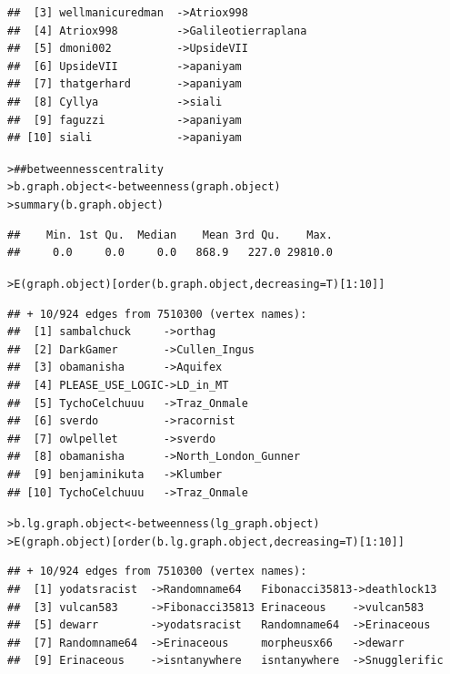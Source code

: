 \documentclass[12pt]{article}\usepackage[]{graphicx}\usepackage[]{color}
\makeatletter
\newcommand{\hlnum}[1]{\textcolor[rgb]{0.82,0.78,0.62}{#1}}%
\newcommand{\hlcom}[1]{\textcolor[rgb]{0.404,0.408,0.42}{#1}}%
\newcommand{\hlopt}[1]{\textcolor[rgb]{0.882,0.878,0.898}{#1}}%
\newcommand{\hlstd}[1]{\textcolor[rgb]{0.882,0.878,0.898}{#1}}%
\newcommand{\hlkwb}[1]{\textcolor[rgb]{0.902,0.675,0.196}{#1}}%
\newcommand{\hlkwc}[1]{\textcolor[rgb]{0.812,0.522,0.388}{#1}}%
\newcommand{\hlkwd}[1]{\textcolor[rgb]{0.733,0.388,0.812}{#1}}%
\newenvironment{kframe}{%
 \def\at@end@of@kframe{}%
 \ifinner\ifhmode%
  \def\at@end@of@kframe{\end{minipage}}%
  \begin{minipage}{\columnwidth}%
 \fi\fi%
 \def\FrameCommand##1{\hskip\@totalleftmargin \hskip-\fboxsep
 \colorbox{shadecolor}{##1}\hskip-\fboxsep
     \hskip-\linewidth \hskip-\@totalleftmargin \hskip\columnwidth}%
 \MakeFramed {\advance\hsize-\width
   \@totalleftmargin\z@ \linewidth\hsize
   \@setminipage}}%
 {\par\unskip\endMakeFramed%
 \at@end@of@kframe}
\newenvironment{knitrout}{}{} %
\makeatother
\begin{document}
\begin{flushleft}
\begin{knitrout}
\begin{kframe}
\begin{verbatim}
##  [3] wellmanicuredman  ->Atriox998         
##  [4] Atriox998         ->Galileotierraplana
##  [5] dmoni002          ->UpsideVII         
##  [6] UpsideVII         ->apaniyam          
##  [7] thatgerhard       ->apaniyam          
##  [8] Cyllya            ->siali             
##  [9] faguzzi           ->apaniyam          
## [10] siali             ->apaniyam
\end{verbatim}
\begin{alltt}
\hlstd{> }\hlcom{## betweenness centrality}
\hlstd{> }\hlstd{b.graph.object} \hlkwb{<-} \hlkwd{betweenness}\hlstd{(graph.object)}
\hlstd{> }\hlkwd{summary}\hlstd{(b.graph.object)}
\end{alltt}
\begin{verbatim}
##    Min. 1st Qu.  Median    Mean 3rd Qu.    Max. 
##     0.0     0.0     0.0   868.9   227.0 29810.0
\end{verbatim}
\begin{alltt}
\hlstd{> }\hlkwd{E}\hlstd{(graph.object)[}\hlkwd{order}\hlstd{(b.graph.object,} \hlkwc{decreasing}\hlstd{=T)[}\hlnum{1}\hlopt{:}\hlnum{10}\hlstd{]]}
\end{alltt}
\begin{verbatim}
## + 10/924 edges from 7510300 (vertex names):
##  [1] sambalchuck     ->orthag             
##  [2] DarkGamer       ->Cullen_Ingus       
##  [3] obamanisha      ->Aquifex            
##  [4] PLEASE_USE_LOGIC->LD_in_MT           
##  [5] TychoCelchuuu   ->Traz_Onmale        
##  [6] sverdo          ->racornist          
##  [7] owlpellet       ->sverdo             
##  [8] obamanisha      ->North_London_Gunner
##  [9] benjaminikuta   ->Klumber            
## [10] TychoCelchuuu   ->Traz_Onmale
\end{verbatim}
\begin{alltt}
\hlstd{> }\hlstd{b.lg.graph.object} \hlkwb{<-} \hlkwd{betweenness}\hlstd{(lg_graph.object)}
\hlstd{> }\hlkwd{E}\hlstd{(graph.object)[}\hlkwd{order}\hlstd{(b.lg.graph.object,} \hlkwc{decreasing}\hlstd{=T)[}\hlnum{1}\hlopt{:}\hlnum{10}\hlstd{]]}
\end{alltt}
\begin{verbatim}
## + 10/924 edges from 7510300 (vertex names):
##  [1] yodatsracist  ->Randomname64   Fibonacci35813->deathlock13   
##  [3] vulcan583     ->Fibonacci35813 Erinaceous    ->vulcan583     
##  [5] dewarr        ->yodatsracist   Randomname64  ->Erinaceous    
##  [7] Randomname64  ->Erinaceous     morpheusx66   ->dewarr        
##  [9] Erinaceous    ->isntanywhere   isntanywhere  ->Snugglerific
\end{verbatim}

\end{kframe}
\end{knitrout}
\end{flushleft}
\end{document}
